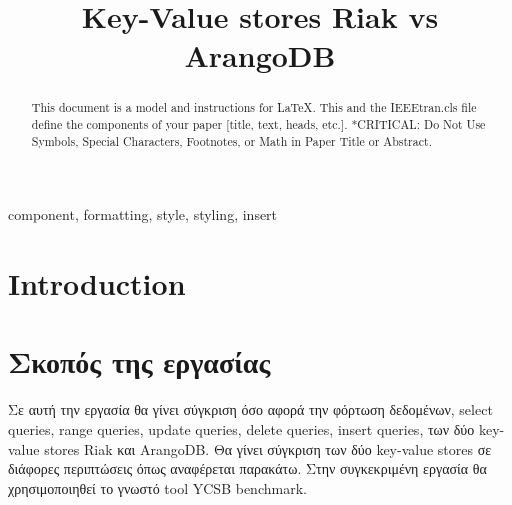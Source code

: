 \documentclass[conference]{IEEEtran}
\begin{document}
\title{Key-Value stores Riak vs ArangoDB \\

}

\author{
\and
{}
\and
{}
}

\maketitle

\begin{abstract}
This document is a model and instructions for \LaTeX.
This and the IEEEtran.cls file define the components of your paper [title, text, heads, etc.]. *CRITICAL: Do Not Use Symbols, Special Characters, Footnotes, 
or Math in Paper Title or Abstract.
\end{abstract}

\begin{IEEEkeywords}
component, formatting, style, styling, insert
\end{IEEEkeywords}

\section{Introduction}

\section{Σκοπός της εργασίας}

Σε αυτή την εργασία θα γίνει σύγκριση όσο αφορά την φόρτωση δεδομένων, select queries, range queries,
update queries, delete queries, insert queries, των δύο key-value stores Riak και ArangoDB. Θα γίνει
σύγκριση των δύο key-value stores σε διάφορες περιπτώσεις όπως αναφέρεται παρακάτω. Στην συγκεκριμένη εργασία θα
χρησιμοποιηθεί το γνωστό tool YCSB benchmark.
\end{document}
